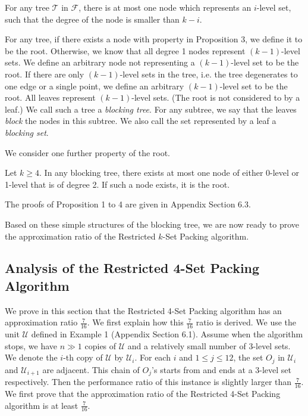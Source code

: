 \documentclass[runningheads,a4paper]{llncs}
\numberwithin{equation}{section}
\begin{document}
\begin{proposition}
For any tree $\mathscr{T}$ in $\mathscr{F}$, there is at most one node which represents an $i$-level set, such that the degree of the node is smaller than $k-i$.
\end{proposition}

For any tree, if there exists a node with property in Proposition 3, we define it to be the root. Otherwise, we know that all degree 1 nodes represent $(k-1)$-level sets. We define an arbitrary node not representing a $(k-1)$-level set to be the root. If there are only $(k-1)$-level sets in the tree, i.e. the tree degenerates to one edge or a single point, we define an arbitrary $(k-1)$-level set to be the root. All leaves represent $(k-1)$-level sets. (The root is not considered to by a leaf.) We call such a tree a \emph{blocking tree}. For any subtree, we say that the leaves \emph{block} the nodes in this subtree. We also call the set represented by a leaf a \emph{blocking set}.

We consider one further property of the root.

\begin{proposition}
Let $k \geq 4$.
In any blocking tree, there exists at most one node of either 0-level or 1-level that is of degree 2. If such a node exists, it is the root.
\end{proposition}

The proofs of Proposition 1 to 4 are given in Appendix Section 6.3.

Based on these simple structures of the blocking tree, we are now ready to prove the approximation ratio of the Restricted $k$-Set Packing algorithm.

\subsection{Analysis of the Restricted 4-Set Packing Algorithm}

We prove in this section that the Restricted 4-Set Packing algorithm has an approximation ratio $\frac{7}{16}$. We first explain how this $\frac{7}{16}$ ratio is derived. We use the unit $\mathcal{U}$ defined in Example 1 (Appendix Section 6.1). Assume when the algorithm stops, we have $n\gg 1$ copies of $\mathcal{U}$ and a relatively small number of 3-level sets. We denote the $i$-th copy of $\mathcal{U}$ by $\mathcal{U}_i$. For each $i$ and $1\leq j\leq 12$, the set $O_j$ in $\mathcal{U}_i$ and $\mathcal{U}_{i+1}$ are adjacent. This chain of $O_j$'s starts from and ends at a 3-level set respectively. Then the performance ratio of this instance is slightly larger than $\frac{7}{16}$. We first prove that the approximation ratio of the Restricted 4-Set Packing algorithm is at least $\frac{7}{16}$.
\end{document}
